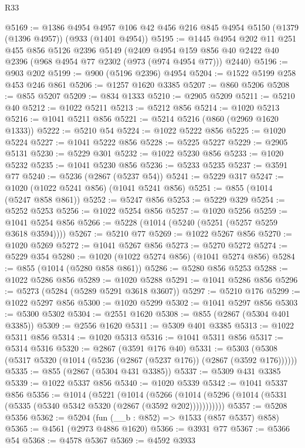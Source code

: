 \begin{lexlean}{R33}
\begin{coremodule}
@5169 := @1386
    @4954
    @4957
    @106
    @42
    @456
    @216
    @845
    @4954
    @5150
    (@1379 (@1396 @4957))
    (@933 (@1401 @4954))
@5195 := @1445
    @4954
    @202
    @11
    @251
    @455
    @856
    @5126
    @2396
    @5149
    (@2409 @4954 @159 @856 @40 @2422 @40 @2396 (@968 @4954 @77 @2302 (@973 (@974 @4954 @77))) @2440)
@5196 := @903 @202
@5199 := @900 (@5196 @2396) @4954
@5204 := @1522 @5199 @258 @453 @246 @861
@5206 := @1257 @1620 @3385
@5207 := @860 @5206
@5208 := @855 @5207
@5209 := @834 @1333
@5210 := @2905 @5209
@5211 := @5210 @40
@5212 := @1022 @5211
@5213 := @5212 @856
@5214 := @1020 @5213
@5216 := @1041 @5211 @856
@5221 := @5214 @5216 (@860 (@2969 @1620 @1333))
@5222 := @5210 @54
@5224 := @1022 @5222 @856
@5225 := @1020 @5224
@5227 := @1041 @5222 @856
@5228 := @5225 @5227
@5229 := @2905 @5131
@5230 := @5229 @301
@5232 := @1022 @5230 @856
@5233 := @1020 @5232
@5235 := @1041 @5230 @856
@5236 := @5233 @5235
@5237 := @3591 @77
@5240 := @5236 (@2867 (@5237 @54))
@5241 := @5229 @317
@5247 := @1020 (@1022 @5241 @856) (@1041 @5241 @856)
@5251 := @855 (@1014 (@5247 @858 @861))
@5252 := @5247 @856
@5253 := @5229 @329
@5254 := @5252 @5253
@5256 := @1022 @5254 @856
@5257 := @1020 @5256
@5259 := @1041 @5254 @856
@5266 := @5228 (@1014 (@5240 (@5251 (@5257 @5259 @3618 @3594))))
@5267 := @5210 @77
@5269 := @1022 @5267 @856
@5270 := @1020 @5269
@5272 := @1041 @5267 @856
@5273 := @5270 @5272
@5274 := @5229 @354
@5280 := @1020 (@1022 @5274 @856) (@1041 @5274 @856)
@5284 := @855 (@1014 (@5280 @858 @861))
@5286 := @5280 @856 @5253
@5288 := @1022 @5286 @856
@5289 := @1020 @5288
@5291 := @1041 @5286 @856
@5296 := @5273 (@5284 (@5289 @5291 @3618 @3607))
@5297 := @5210 @176
@5299 := @1022 @5297 @856
@5300 := @1020 @5299
@5302 := @1041 @5297 @856
@5303 := @5300 @5302
@5304 := @2551 @1620
@5308 := @855 (@2867 (@5304 @401 @3385))
@5309 := @2556 @1620
@5311 := @5309 @401 @3385
@5313 := @1022 @5311 @856
@5314 := @1020 @5313
@5316 := @1041 @5311 @856
@5317 := @5314 @5316
@5320 := @2867 (@3591 @176 @40)
@5331 := @5303 (@5308 (@5317 @5320 (@1014 (@5236 (@2867 (@5237 @176)) (@2867 (@3592 @176))))))
@5335 := @855 (@2867 (@5304 @431 @3385))
@5337 := @5309 @431 @3385
@5339 := @1022 @5337 @856
@5340 := @1020 @5339
@5342 := @1041 @5337 @856
@5356 := @1014
    (@5221
      (@1014
        (@5266 (@1014 (@5296 (@1014 (@5331 (@5335 (@5340 @5342 @5320 (@2867 (@3592 @202)))))))))))
@5357 := @5208 @5356
@5362 := @5204 (fun (__b : @852) => @1533 (@857 @5357) @858)
@5365 := @4561 (@2973 @4886 @1620)
@5366 := @3931 @77
@5367 := @5366 @54
@5368 := @4578 @5367
@5369 := @4592 @3933

\end{coremodule}
\end{lexlean}
